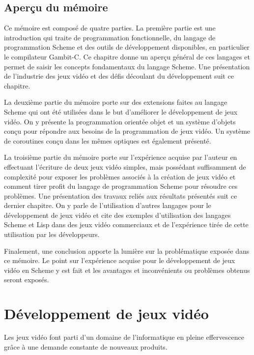 \documentclass[12pt,oneside,letterpaper,francais]{book}
\begin{document}
\section{Aperçu du mémoire}
Ce mémoire est composé de quatre parties. La première partie est une
introduction qui traite de programmation fonctionnelle, du langage de
programmation Scheme et des outils de développement disponibles, en
particulier le compilateur Gambit-C. Ce chapitre donne un aperçu
général de ces langages et permet de saisir les concepts fondamentaux
du langage Scheme. Une présentation de l'industrie des jeux vidéo et
des défis découlant du développement suit ce chapitre.

La deuxième partie du mémoire porte sur des extensions faites au
langage Scheme qui ont été utilisées dans le but d'améliorer le
développement de jeux vidéo. On y présente la programmation orientée
objet et un système d'objets conçu pour répondre aux besoins de la
programmation de jeux vidéo. Un système de coroutines conçu dans les
mêmes optiques est également présenté.

La troisième partie du mémoire porte sur l'expérience acquise par
l'auteur en effectuant l'écriture de deux jeux vidéo simples, mais
possédant suffisamment de complexité pour exposer les problèmes
associés à la création de jeux vidéo et comment tirer profit du
langage de programmation Scheme pour résoudre ces problèmes. Une
présentation des travaux reliés aux résultats présentés suit ce
dernier chapitre. On y parle de l'utilisation d'autres langages pour
le développement de jeux vidéo et cite des exemples d'utilisation des
langages Scheme et Lisp dans des jeux vidéo commerciaux et de
l'expérience tirée de cette utilisation par les développeurs.

Finalement, une conclusion apporte la lumière sur la problématique
exposée dans ce mémoire. Le point sur l'expérience acquise pour le
développement de jeux vidéo en Scheme y est fait et les avantages et
inconvénients ou problèmes obtenus seront exposés.




\chapter{Développement de jeux vidéo}
\label{Chap:JV}

Les jeux vidéo font parti d'un domaine de l'informatique en pleine
effervescence grâce à une demande constante de nouveaux
produits. 
\end{document}
